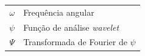 \documentclass[a4paper,12pt,twoside,english,brazilian]{book}
\begin{document}

\begin{tabular}{rl}
  $\omega$ & Frequência angular\\
    $\psi$ & Função de análise \emph{wavelet}\\
    $\Psi$ & Transformada de Fourier de $\psi$\\
\end{tabular}

\clearpage


\disablenewpage{\listoffigures}

\disablenewpage{\listoftables}


\tableofcontents

\egroup %

\end{document}
